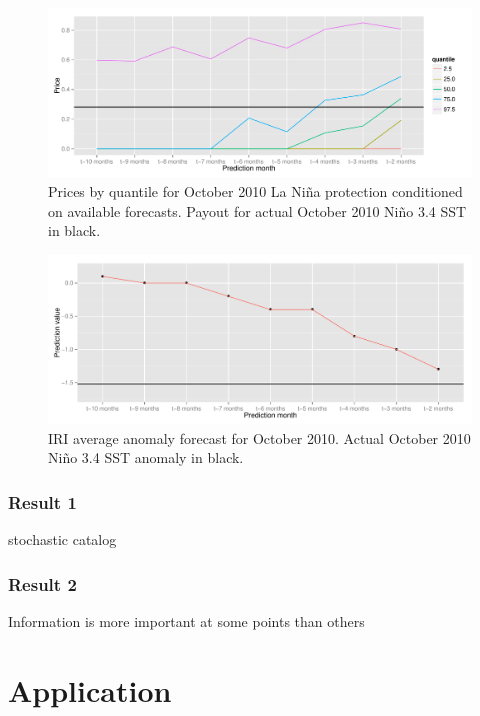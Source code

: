 \documentclass[authoryear]{article}
\begin{document}
\begin{figure}[!htbp]
  \includegraphics[width=\linewidth]{Pricingfigs/pricesOctober2010}
  \caption{Prices by quantile for October 2010 La Ni\~na protection conditioned on available forecasts. Payout for actual October 2010 Ni\~no 3.4 SST in black.}
   \label{fig:pricesOctober2010}
\end{figure}

\begin{figure}[!htbp]
  \includegraphics[width=\linewidth]{Pricingfigs/predOctober2010}
  \caption{IRI average anomaly forecast for October 2010. Actual October 2010 Ni\~no 3.4 SST anomaly in black.}
   \label{fig:predOctober2010}
\end{figure}



\subsubsection{Result 1} 
stochastic catalog

\subsubsection{Result 2}
Information is more important at some points than others



\section{Application}
\end{document}
